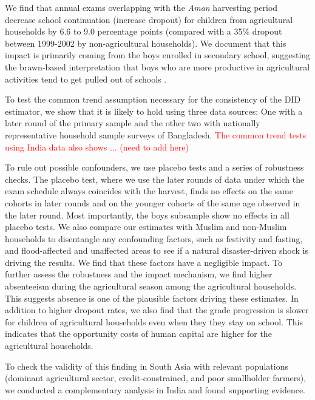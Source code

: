 \documentclass[12pt,letterpaper]{article}
\newcommand{\SAdded}[1]{\textcolor{red}{#1}}
\newcommand{\0}{\ensuremath{\mbox{\boldmath $0$}}}
\begin{document}
We find that annual exams overlapping with the \textit{Aman} harvesting period decrease school continuation (increase dropout) for children from agricultural households by 6.6 to 9.0 percentage points (compared with a 35\% dropout between 1999-2002 by non-agricultural households). We document that this impact is primarily coming from the boys enrolled in secondary school, suggesting the brawn-based interpretation that boys who are more productive in agricultural activities tend to get pulled out of schools \citep{PittRosenzweigHassan2010}. 

To test the common trend assumption necessary for the consistency of the DID estimator, we show that it is likely to hold using three data sources: One with a later round of the primary sample and the other two with nationally representative household sample surveys of Bangladesh. \SAdded{The common trend tests using India data also shows ... (need to add here)}

To rule out possible confounders, we use placebo tests and a series of robustness checks. The placebo test, where we use the later rounds of data under which the exam schedule always coincides with the harvest, finds no effects on the same cohorts in later rounds and on the younger cohorts of the same age observed in the later round. Most importantly, the boys subsample show no effects in all placebo tests. We also compare our estimates with Muslim and non-Muslim households to disentangle any confounding factors, such as festivity and fasting, and flood-affected and unaffected areas to see if a natural disaster-driven shock is driving the results. We find that these factors have a negligible impact. To further assess the robustness and the impact mechanism, we find higher absenteeism during the agricultural season among the agricultural households. This suggests absence is one of the plausible factors driving these estimates. In addition to higher dropout rates, we also find that the grade progression is slower for children of agricultural households even when they they stay on school. This indicates that the opportunity costs of human capital are higher for the agricultural households. 

To check the validity of this finding in South Asia with relevant populations (dominant agricultural sector, credit-constrained, and poor smallholder farmers), we conducted a complementary analysis in India and found supporting evidence. 
\end{document}
